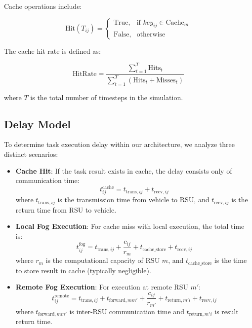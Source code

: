 Cache operations include:

\begin{equation}
    \text{Hit}(T_{ij}) = 
    \begin{cases}
        \text{True}, & \text{if } key_{ij} \in \text{Cache}_m \\
        \text{False}, & \text{otherwise}
    \end{cases}
\end{equation}

The cache hit rate is defined as:

\begin{equation}
    \text{HitRate} = \frac{\sum_{t=1}^{T} \text{Hits}_t}{\sum_{t=1}^{T} (\text{Hits}_t + \text{Misses}_t)}
\end{equation}

where $T$ is the total number of timesteps in the simulation.

\subsection{Delay Model}

To determine task execution delay within our architecture, we analyze three distinct scenarios:

\begin{itemize}
    \item \textbf{Cache Hit}: If the task result exists in cache, the delay consists only of communication time:
    \begin{equation}
        t_{ij}^{\text{cache}} = t_{\text{trans},ij} + t_{\text{recv},ij}
    \end{equation}
    where $t_{\text{trans},ij}$ is the transmission time from vehicle to RSU, and $t_{\text{recv},ij}$ is the return time from RSU to vehicle.
    
    \item \textbf{Local Fog Execution}: For cache miss with local execution, the total time is:
    \begin{equation}
        t_{ij}^{\text{fog}} = t_{\text{trans},ij} + \frac{c_{ij}}{r_m} + t_{\text{cache\_store}} + t_{\text{recv},ij}
    \end{equation}
    where $r_m$ is the computational capacity of RSU $m$, and $t_{\text{cache\_store}}$ is the time to store result in cache (typically negligible).
    
    \item \textbf{Remote Fog Execution}: For execution at remote RSU $m'$:
    \begin{equation}
        t_{ij}^{\text{remote}} = t_{\text{trans},ij} + t_{\text{forward},mm'} + \frac{c_{ij}}{r_{m'}} + t_{\text{return},m'i} + t_{\text{recv},ij}
    \end{equation}
    where $t_{\text{forward},mm'}$ is inter-RSU communication time and $t_{\text{return},m'i}$ is result return time.
\end{itemize}

